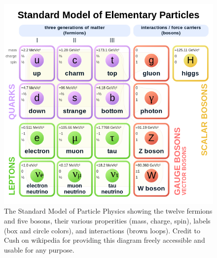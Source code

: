 \begin{figure}
    \centering
    \includegraphics[width=\textwidth]{figures/intro/Standard_Model_of_Elementary_Particles.svg.png}
    \caption{
        The Standard Model of Particle Physics showing the twelve fermions and five bosons,
        their various properities (mass, charge, spin), labels (box and circle colors),
        and interactions (brown loops). Credit to Cush on wikipedia for
        providing this diagram freely accessible and usable for any purpose.
    }
    \label{fig:sm}
\end{figure}

